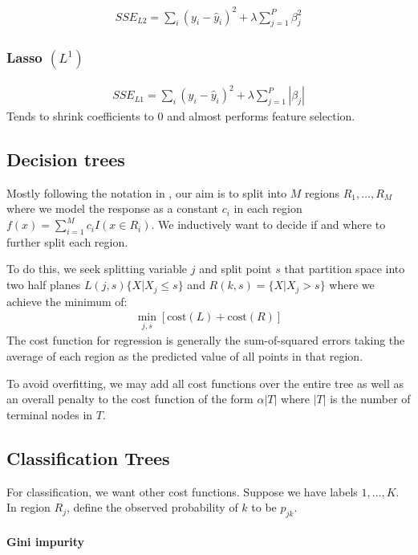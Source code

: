 \documentclass[12pt]{article}
\begin{document}
\begin{align*}
  SSE_{L2} = \sum_i (y_i - \hat y_i)^2 + \lambda\sum_{j=1}^P \beta_j^2
\end{align*}

\subsubsection{Lasso $(L^1)$}

\begin{align*}
  SSE_{L1} = \sum_i (y_i - \hat y_i)^2 + \lambda\sum_{j=1}^P |\beta_j|
\end{align*}
Tends to shrink coefficients to 0 and almost performs feature selection.

\subsection{Decision trees}

Mostly following the notation in \cite[\S9.2]{esl}, our aim is to split into $M$
regions $R_1,\ldots,R_M$ where we model the response as a constant $c_i$ in each
region $f(x) = \sum_{i=1}^M c_i I(x\in R_i)$. We inductively want to decide if
and where to further split each region.

To do this, we seek splitting variable $j$ and split point $s$ that partition
space into two half planes $L(j,s) \{X | X_j \leq s\}$ and $R(k,s) = \{X | X_j >
s\}$ where we achieve the minimum of:
\begin{align*}
  \min_{j,s} \left[ \text{cost}(L) + \text{cost}(R) \right]
\end{align*}
The cost function for regression is generally the sum-of-squared errors taking
the average of each region as the predicted value of all points in that region.

To avoid overfitting, we may add all cost functions over the entire tree as well
as an overall penalty to the cost function of the form
$\alpha |T|$ where $|T|$ is the number of terminal nodes in $T$.

\subsection{Classification Trees}

For classification, we want other cost functions. Suppose we have labels
$1,\ldots,K$. In region $R_j$, define the observed probability of $k$ to be
$\hat p_{jk}$.

\paragraph{Gini impurity}
\end{document}
